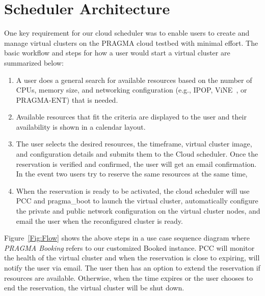 \documentclass[times]{cpeauth}
\begin{document}
\section{Scheduler Architecture}
\label{Sec:Arch}

One key requirement for our cloud scheduler was to enable users to create and manage virtual clusters on the PRAGMA cloud testbed with minimal effort. 
The basic workflow and steps for how a user would start a virtual cluster are summarized below:

\begin{enumerate}
\item A user does a general search for available resources based on the number of CPUs, memory size, and networking configuration (e.g., IPOP, ViNE~\cite{vine}, or PRAGMA-ENT) that is needed.  
\item Available resources that fit the criteria are displayed to the user and their availability is shown in a calendar layout.  
\item The user selects the desired resources, the timeframe, virtual cluster image, and configuration details and submits them to the Cloud scheduler.  Once the reservation is verified and confirmed, the user will get an email confirmation.  In the event two users try to reserve the same resources at the same time,
\item When the reservation is ready to be activated, the cloud scheduler will use PCC and pragma\_boot to launch the virtual cluster, automatically configure the private and public network configuration on the virtual cluster nodes, and email the user when the reconfigured cluster is ready.   
\end{enumerate}

Figure~\ref{Fig:Flow} shows the above steps in a use case sequence diagram where \textit{PRAGMA Booking} refers to our customized Booked instance.  PCC will monitor the health of the virtual cluster and when the reservation is close to expiring, will notify the user via email. The user then has an option to extend the reservation if resources are available.  Otherwise, when the time expires or the user chooses to end the reservation, the virtual cluster will be shut down.
\end{document}
